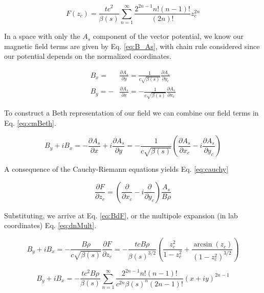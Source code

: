 \begin{equation} \label{eq:powF}
	F(z_c) = \frac{t c^2}{\beta(s)} \sum_{n=1}^{\infty} \frac{2^{2n-1}n!(n-1)!}{(2n)!} z_c^{2n}
\end{equation}

In a space with only the $A_s$ component of the vector potential, we know our magnetic field terms are given by Eq. \ref{eq:B_As}, with chain rule considered since our potential depends on the normalized coordinates.

\begin{equation} \label{eq:B_As}
\begin{split}
	B_x = &\frac{\partial A_s}{\partial y} = \frac{1}{c\sqrt{\beta(s)}}\frac{\partial A_s}{\partial y_c}\\
	B_y = -&\frac{\partial A_s}{\partial x} = -\frac{1}{c\sqrt{\beta(s)}}\frac{\partial A_s}{\partial x_c}
\end{split}
\end{equation}

To construct a Beth representation of our field we can combine our field terms in Eq. \ref{eq:cmBeth}.

\begin{equation} \label{eq:cmBeth}
	B_y + i B_x  = -\frac{\partial A_s}{\partial x} + i\frac{\partial A_s}{\partial y} = -\frac{1}{c\sqrt{\beta(s)}}\left(\frac{\partial A_s}{\partial x_c} - i\frac{\partial A_s}{\partial y_c}\right)
\end{equation}

A consequence of the Cauchy-Riemann equations yields Eq. \ref{eq:cauchy}

\begin{equation} \label{eq:cauchy}
	\frac{\partial F}{\partial z_c} = \left(\frac{\partial }{\partial x_c} - i\frac{\partial }{\partial y_c}\right) \frac{A_s}{B\rho}
\end{equation}

Substituting, we arrive at Eq. \ref{eq:BdF}, or the multipole expansion (in lab coordinates) Eq. \ref{eq:dnMult}.

\begin{equation} \label{eq:BdF}
	B_y + i B_x  = -\frac{B\rho}{c\sqrt{\beta(s)}}\frac{\partial F}{\partial z_c} = - \frac{t c B\rho}{\beta(s)^{3/2}} \left( \frac{z_c^2}{1 - z_c^2} + \frac{\arcsin{(z_c)}}{\left(1-z_c^2\right)^{3/2}}\right)
\end{equation}

\begin{equation} \label{eq:dnMult}
	B_y + i B_x = - \frac{t c^2 B\rho}{\beta(s)} \sum_{n=1}^{\infty} \frac{2^{2n-1}n!(n-1)!}{c^{2n}\beta(s)^n(2n-1)!} (x + i y)^{2n -1}
\end{equation}

